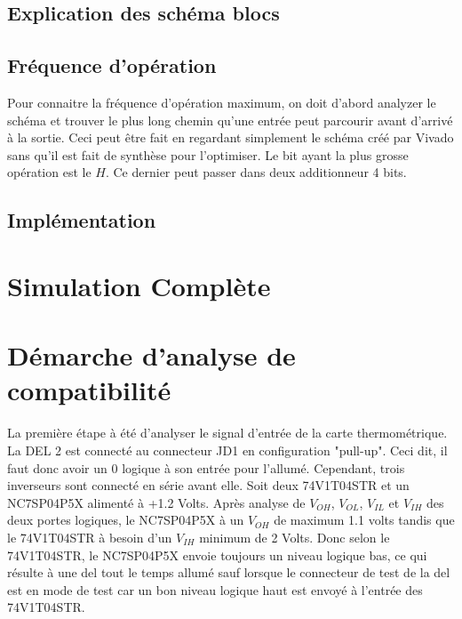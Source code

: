 \documentclass[a11paper]{article}
\begin{document}
\subsection{Explication des schéma blocs}

\subsection{Fréquence d'opération}
Pour connaitre la fréquence d'opération maximum, on doit d'abord analyzer le schéma et trouver le plus long chemin qu'une entrée peut
parcourir avant d'arrivé à la sortie. Ceci peut être fait en regardant simplement le schéma créé par Vivado sans qu'il est fait de
synthèse pour l'optimiser. Le bit ayant la plus grosse opération est le $H$. Ce dernier peut passer dans deux additionneur 4 bits.

\subsection{Implémentation}

\section{Simulation Complète}

\section{Démarche d'analyse de compatibilité}
La première étape à été d'analyser le signal d'entrée de la carte thermométrique. La DEL 2 est connecté au connecteur JD1 en
configuration "pull-up". Ceci dit, il faut donc avoir un 0 logique à son entrée pour l'allumé. Cependant, trois inverseurs sont
connecté en série avant elle. Soit deux 74V1T04STR et un NC7SP04P5X alimenté à +1.2 Volts. Après analyse de $V_{OH}$, $V_{OL}$, $V_{IL}$
et $V_{IH}$ des deux portes logiques, le NC7SP04P5X à un $V_{OH}$ de maximum 1.1 volts tandis que le 74V1T04STR à besoin d'un $V_{IH}$
minimum de 2 Volts. Donc selon le 74V1T04STR, le NC7SP04P5X envoie toujours un niveau logique bas, ce qui résulte à une del
tout le temps allumé sauf lorsque le connecteur de test de la del est en mode de test car un bon niveau logique haut est envoyé à
l'entrée des 74V1T04STR.


\end{document}
